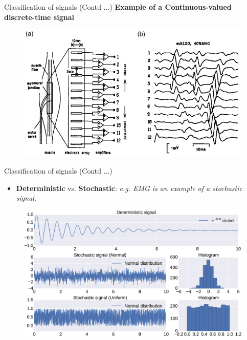 \documentclass{beamer}
\begin{document}
\begin{frame}{Classification of signals (Contd ...)}
\textbf{Example of a Continuous-valued discrete-time signal}
\begin{figure}
\includegraphics[width=\textwidth]{img/emg_array.png}
\end{figure}
\end{frame}

\begin{frame}{Classification of signals (Contd ...)}
\begin{itemize}
\item \textbf{Deterministic} vs. \textbf{Stochastic}: \textit{e.g. EMG is an example of a stochastic signal.}
\end{itemize}
\begin{figure}
\includegraphics[width=\textwidth]{img/det_stoch.eps}
\end{figure}
\end{frame}
\end{document}
